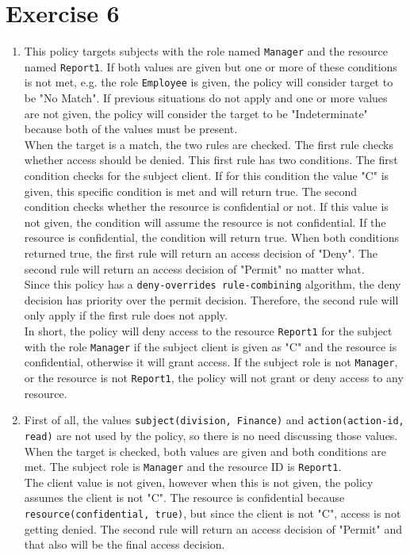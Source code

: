 \documentclass[twoside, a4paper, fleqn, reqno]{article}
\begin{document}
\section*{Exercise 6}

\begin{enumerate}
	\item This policy targets subjects with the role named \texttt{Manager} and the
	resource named \texttt{Report1}. If both values are given but one or more of these conditions is not met, e.g. the role \texttt{Employee} is given,
	the policy will consider target to be "No Match". If previous situations do not apply and one or more values are not given,
	the policy will consider the target to be "Indeterminate" because both of the values must be present.\\
	When the target is a match, the two rules are checked. The first rule checks whether access should
	be denied. This first rule has two conditions. The first condition checks for the subject client.
	If for this condition the value "C" is given, this specific condition is met and will return true.
	The second condition checks whether the resource is confidential or not. If this value is not given, the
	condition will assume the resource is not confidential. If the resource is confidential, the condition will return true.
	When both conditions returned true, the first rule will return an access decision of "Deny".
	The second rule will return an access decision of "Permit" no matter what.\\
	Since this policy has a \texttt{deny-overrides rule-combining} algorithm, the deny decision has priority over the permit decision.
	Therefore, the second rule will only apply if the first rule does not apply.\\

	In short, the policy will deny access to the resource \texttt{Report1} for the subject with the role \texttt{Manager} if the subject client
	is given as "C" and the resource is confidential, otherwise it will grant access. If the subject role is not \texttt{Manager}, or the resource is not \texttt{Report1},
	the policy will not grant or deny access to any resource.\\
	
	\item First of all, the values \texttt{subject(division, Finance)} and \texttt{action(action-id, read)} are not used by the policy,
	so there is no need discussing those values. When the target is checked, both values are given and both conditions are met. The subject
	role is \texttt{Manager} and the resource ID is \texttt{Report1}.\\
	The client value is not given, however when this is not given, the policy assumes the client is not "C". The resource is confidential because
	\texttt{resource(confidential, true)}, but since the client is not "C", access is not getting denied. The second rule will return an access decision of "Permit" and that also will
	be the final access decision.\\
\end{enumerate}
\end{document}
